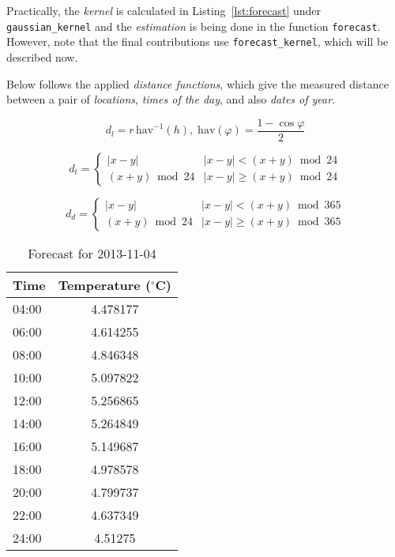 \documentclass[a4paper, twocolumn]{article}
\begin{document}
    Practically, the \emph{kernel} is calculated in Listing~\ref{lst:forecast} under \texttt{gaussian\_kernel} and the \emph{estimation} is being done in the function \texttt{forecast}. However, note that the final contributions use \texttt{forecast\_kernel}, which will be described now.

    Below follows the applied \emph{distance functions}, which give the measured distance between a pair of \emph{locations}, \emph{times of the day}, and also \emph{dates of year}.

    \begin{equation*} \label{eq:location}
        d_l = r\, \mathrm{hav}^{-1}(h),\; \mathrm{hav}(\varphi) = \frac{1 - \cos\varphi}{2}
    \end{equation*}

    \begin{equation*} \label{eq:time}
        d_t = \begin{cases}
            |x - y| & |x - y| < (x + y) \bmod 24\\
            (x + y) \bmod 24 & |x - y| \geq (x + y) \bmod 24
        \end{cases}
    \end{equation*}

    \begin{equation*} \label{eq:day}
        d_d = \begin{cases}
            |x - y| & |x - y| < (x + y) \bmod 365\\
            (x + y) \bmod 24 & |x - y| \geq (x + y) \bmod 365
        \end{cases}
    \end{equation*}

    \begin{table}[h!]
        \begin{center}
            \begin{tabular}{lc}
                \toprule
                \textbf{Time} & \textbf{Temperature ($^\circ$C)} \\
                \midrule
                04:00 & 4.478177 \\
                06:00 & 4.614255 \\
                08:00 & 4.846348 \\
                10:00 & 5.097822 \\
                12:00 & 5.256865 \\
                14:00 & 5.264849 \\
                16:00 & 5.149687 \\
                18:00 & 4.978578 \\
                20:00 & 4.799737 \\
                22:00 & 4.637349 \\
                24:00 & 4.51275 \\
                \bottomrule
            \end{tabular}
        \end{center}
        \caption{Forecast for 2013-11-04}
        \label{table:forecast}
    \end{table}
\end{document}
